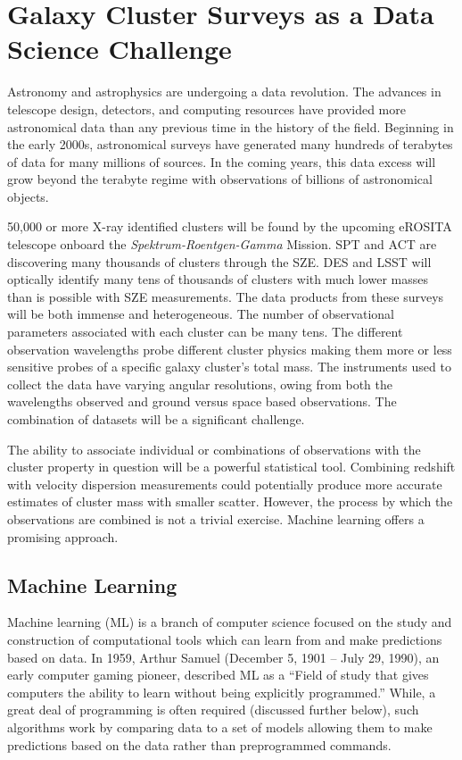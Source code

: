 \section{Galaxy Cluster Surveys as a Data Science Challenge}
Astronomy and astrophysics are undergoing a data revolution. The advances in telescope design, detectors, and computing resources have provided more astronomical data than any previous time in the history of the field. Beginning in the early 2000s, astronomical surveys have generated many hundreds of terabytes of data for many millions of sources. In the coming years, this data excess will grow beyond the terabyte regime with observations of billions of astronomical objects. 

50,000 or more X-ray identified clusters will be found by the upcoming eROSITA telescope onboard the \emph{Spektrum-Roentgen-Gamma} Mission. SPT and ACT are discovering many thousands of clusters through the SZE. DES and LSST will optically identify many tens of thousands of clusters with much lower masses than is possible with SZE measurements. The data products from these surveys will be both immense and heterogeneous. The number of observational parameters associated with each cluster can be many tens. The different observation wavelengths probe different cluster physics making them more or less sensitive probes of a specific galaxy cluster's total mass. The instruments used to collect the data have varying angular resolutions, owing from both the wavelengths observed and ground versus space based observations. The combination of datasets will be a significant challenge.

The ability to associate individual or combinations of observations with the cluster property in question will be a powerful statistical tool. Combining redshift with velocity dispersion measurements could potentially produce more accurate estimates of cluster mass with smaller scatter. However, the process by which the observations are combined is not a trivial exercise. Machine learning offers a promising approach.

\subsection{Machine Learning}
Machine learning (ML) is a branch of computer science focused on the study and construction of computational tools which can learn from and make predictions based on data. In 1959, Arthur Samuel (December 5, 1901 -- July 29, 1990), an early computer gaming pioneer, described ML as a ``Field of study that gives computers the ability to learn without being explicitly programmed.'' While, a great deal of programming is often required (discussed further below), such algorithms work by comparing data to a set of models allowing them to make predictions based on the data rather than preprogrammed commands.


